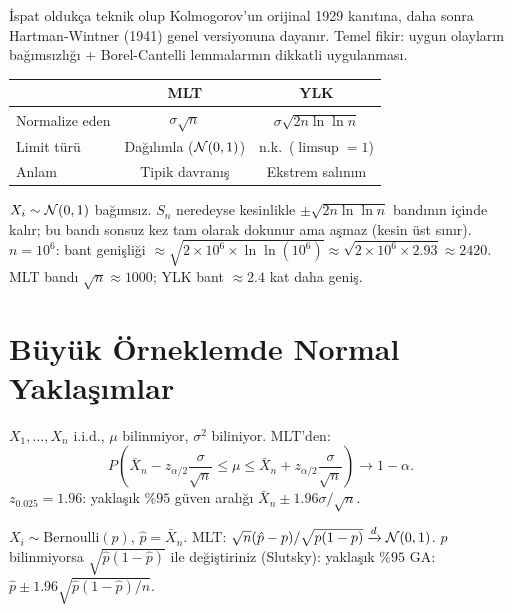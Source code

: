İspat oldukça teknik olup Kolmogorov'un orijinal 1929 kanıtına, daha sonra
Hartman-Wintner (1941) genel versiyonuna dayanır.
Temel fikir: uygun olayların bağımsızlığı + Borel-Cantelli lemmalarının dikkatli uygulanması.

\begin{onerme}
\begin{center}
\begin{tabular}{lcc}
\toprule
 & MLT & YLK \\
\midrule
Normalize eden & $\sigma\sqrt{n}$ & $\sigma\sqrt{2n\ln\ln n}$ \\
Limit türü & Dağılımla ($\mathcal{N}(0,1)$) & n.k.\ ($\limsup = 1$) \\
Anlam & Tipik davranış & Ekstrem salınım \\
\bottomrule
\end{tabular}
\end{center}
\end{onerme}

\begin{ornek}
$X_i \sim \mathcal{N}(0,1)$ bağımsız. $S_n$ neredeyse kesinlikle
$\pm\sqrt{2n\ln\ln n}$ bandının içinde kalır; bu bandı sonsuz kez tam olarak dokunur
ama aşmaz (kesin üst sınır).
$n = 10^6$: bant genişliği $\approx \sqrt{2 \times 10^6 \times \ln\ln(10^6)} \approx \sqrt{2\times10^6\times2.93} \approx 2420$.
MLT bandı $\sqrt{n} \approx 1000$; YLK bant $\approx 2.4$ kat daha geniş.
\end{ornek}

\section{Büyük Örneklemde Normal Yaklaşımlar}
\label{sec:buyuk_orneklem}

\begin{onerme}
\label{prop:guven_araligi}
$X_1, \ldots, X_n$ i.i.d., $\mu$ bilinmiyor, $\sigma^2$ biliniyor. MLT'den:
\[
  P\!\left(\bar{X}_n - z_{\alpha/2}\frac{\sigma}{\sqrt{n}} \leq \mu \leq \bar{X}_n + z_{\alpha/2}\frac{\sigma}{\sqrt{n}}\right) \to 1-\alpha.
\]
$z_{0.025} = 1.96$: yaklaşık $\%95$ güven aralığı $\bar{X}_n \pm 1.96\sigma/\sqrt{n}$.
\end{onerme}

\begin{onerme}
\label{prop:oran_guven}
$X_i \sim \mathrm{Bernoulli}(p)$, $\hat{p} = \bar{X}_n$. MLT:
$\sqrt{n}(\hat{p}-p)/\sqrt{p(1-p)} \xrightarrow{d} \mathcal{N}(0,1)$.
$p$ bilinmiyorsa $\sqrt{\hat{p}(1-\hat{p})}$ ile değiştiriniz (Slutsky):
yaklaşık $\%95$ GA: $\hat{p} \pm 1.96\sqrt{\hat{p}(1-\hat{p})/n}$.
\end{onerme}

